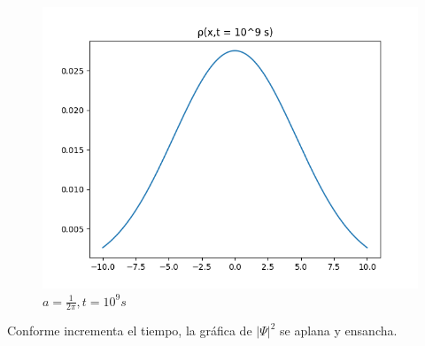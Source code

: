 \begin{figure}[H]
    \includegraphics[scale=0.45]{imagenes/graficas_particulalibre/rho(x,t=10^9).png}
    \caption{\emph{$a = \frac{1}{2\pi}, t = 10^9s$}}
\end{figure}

Conforme incrementa el tiempo, la gráfica de $\lvert\Psi\rvert^2$ se aplana y ensancha.
